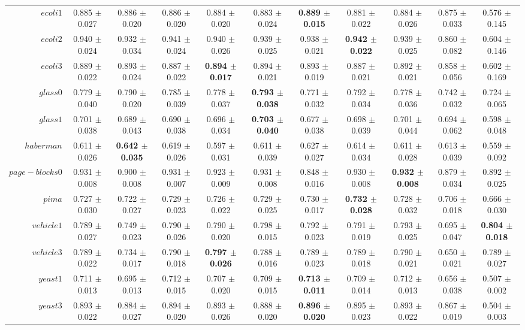 \begin{table}[!ht]
{\begin{tabular}{r c c c c c c c c c c}
$ecoli1$ & 0.885 $\pm$ 0.027 & 0.886 $\pm$ 0.020 & 0.886 $\pm$ 0.020 & 0.884 $\pm$ 0.020 & 0.883 $\pm$ 0.024 & \textbf{0.889 $\pm$ 0.015} & 0.881 $\pm$ 0.022 & 0.884 $\pm$ 0.026 & 0.875 $\pm$ 0.033 & 0.576 $\pm$ 0.145 \\
$ecoli2$ & 0.940 $\pm$ 0.024 & 0.932 $\pm$ 0.034 & 0.941 $\pm$ 0.024 & 0.940 $\pm$ 0.026 & 0.939 $\pm$ 0.025 & 0.938 $\pm$ 0.021 & \textbf{0.942 $\pm$ 0.022} & 0.939 $\pm$ 0.025 & 0.860 $\pm$ 0.082 & 0.604 $\pm$ 0.146 \\
$ecoli3$ & 0.889 $\pm$ 0.022 & 0.893 $\pm$ 0.024 & 0.887 $\pm$ 0.022 & \textbf{0.894 $\pm$ 0.017} & 0.894 $\pm$ 0.021 & 0.893 $\pm$ 0.019 & 0.887 $\pm$ 0.021 & 0.892 $\pm$ 0.021 & 0.858 $\pm$ 0.056 & 0.602 $\pm$ 0.169 \\
$glass0$ & 0.779 $\pm$ 0.040 & 0.790 $\pm$ 0.020 & 0.785 $\pm$ 0.039 & 0.778 $\pm$ 0.037 & \textbf{0.793 $\pm$ 0.038} & 0.771 $\pm$ 0.032 & 0.792 $\pm$ 0.034 & 0.778 $\pm$ 0.036 & 0.742 $\pm$ 0.032 & 0.724 $\pm$ 0.065 \\
$glass1$ & 0.701 $\pm$ 0.038 & 0.689 $\pm$ 0.043 & 0.690 $\pm$ 0.038 & 0.696 $\pm$ 0.034 & \textbf{0.703 $\pm$ 0.040} & 0.677 $\pm$ 0.038 & 0.698 $\pm$ 0.039 & 0.701 $\pm$ 0.044 & 0.694 $\pm$ 0.062 & 0.598 $\pm$ 0.048 \\
$haberman$ & 0.611 $\pm$ 0.026 & \textbf{0.642 $\pm$ 0.035} & 0.619 $\pm$ 0.026 & 0.597 $\pm$ 0.031 & 0.611 $\pm$ 0.039 & 0.627 $\pm$ 0.027 & 0.614 $\pm$ 0.034 & 0.611 $\pm$ 0.028 & 0.613 $\pm$ 0.039 & 0.559 $\pm$ 0.092 \\
$page-blocks0$ & 0.931 $\pm$ 0.008 & 0.900 $\pm$ 0.008 & 0.931 $\pm$ 0.007 & 0.923 $\pm$ 0.009 & 0.931 $\pm$ 0.008 & 0.848 $\pm$ 0.016 & 0.930 $\pm$ 0.008 & \textbf{0.932 $\pm$ 0.008} & 0.879 $\pm$ 0.034 & 0.892 $\pm$ 0.025 \\
$pima$ & 0.727 $\pm$ 0.030 & 0.722 $\pm$ 0.027 & 0.729 $\pm$ 0.023 & 0.726 $\pm$ 0.022 & 0.729 $\pm$ 0.025 & 0.730 $\pm$ 0.017 & \textbf{0.732 $\pm$ 0.028} & 0.728 $\pm$ 0.032 & 0.706 $\pm$ 0.018 & 0.666 $\pm$ 0.030 \\
$vehicle1$ & 0.789 $\pm$ 0.027 & 0.749 $\pm$ 0.023 & 0.790 $\pm$ 0.026 & 0.790 $\pm$ 0.020 & 0.798 $\pm$ 0.015 & 0.792 $\pm$ 0.023 & 0.791 $\pm$ 0.019 & 0.793 $\pm$ 0.025 & 0.695 $\pm$ 0.047 & \textbf{0.804 $\pm$ 0.018} \\
$vehicle3$ & 0.789 $\pm$ 0.022 & 0.734 $\pm$ 0.017 & 0.790 $\pm$ 0.018 & \textbf{0.797 $\pm$ 0.026} & 0.788 $\pm$ 0.016 & 0.789 $\pm$ 0.023 & 0.789 $\pm$ 0.018 & 0.790 $\pm$ 0.021 & 0.650 $\pm$ 0.021 & 0.789 $\pm$ 0.027 \\
$yeast1$ & 0.711 $\pm$ 0.013 & 0.695 $\pm$ 0.013 & 0.712 $\pm$ 0.015 & 0.707 $\pm$ 0.020 & 0.709 $\pm$ 0.015 & \textbf{0.713 $\pm$ 0.011} & 0.709 $\pm$ 0.014 & 0.712 $\pm$ 0.013 & 0.656 $\pm$ 0.038 & 0.507 $\pm$ 0.002 \\
$yeast3$ & 0.893 $\pm$ 0.022 & 0.884 $\pm$ 0.027 & 0.894 $\pm$ 0.020 & 0.893 $\pm$ 0.026 & 0.888 $\pm$ 0.020 & \textbf{0.896 $\pm$ 0.020} & 0.895 $\pm$ 0.023 & 0.893 $\pm$ 0.022 & 0.867 $\pm$ 0.019 & 0.504 $\pm$ 0.003 \\
\end{tabular}}
\end{table}
